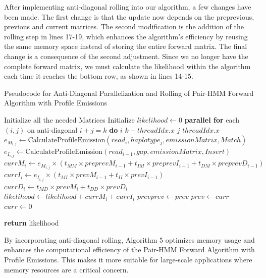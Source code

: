 \documentclass[PhD]{PHlab-thesis}
\begin{document}
After implementing anti-diagonal rolling into our algorithm, a few changes have been made. The first change is that the update now depends on the preprevious, previous and current matrices. The second modification is the addition of the rolling step in lines 17-19, which enhances the algorithm's efficiency by reusing the same memory space instead of storing the entire forward matrix. The final change is a consequence of the second adjustment. Since we no longer have the complete forward matrix, we must calculate the likelihood within the algorithm each time it reaches the bottom row, as shown in lines 14-15.
\newpage
\begin{algorithm}[h]
\caption{Pseudocode for Anti-Diagonal Parallelization and Rolling of Pair-HMM Forward Algorithm with Profile Emissions}
\begin{algorithmic}[1]
\State Initialize all the needed Matrices
\State Initialize $likelihood \gets0$
    \State \textbf{parallel for} each $(i, j)$ on anti-diagonal $i+j=k$ \textbf{do}
    \State $i$ \gets $k - threadIdx.x$
    \State $j$ \gets $threadIdx.x$
        \State $e_{M_{i,j}} \gets \text{CalculateProfileEmission}(read_i, haplotype_j, emissionMatrix, Match)$
        \State $e_{I_{i,j}} \gets \text{CalculateProfileEmission}(read_{i-1}, gap, emissionMatrix, Insert)$
        \State $currM_{i} \gets e_{M_{i,j}} \times (t_{MM} \times preprevM_{i-1} + t_{IM} \times preprevI_{i-1} + t_{DM} \times preprevD_{i-1})$
        \State $currI_{i} \gets e_{I_{i,j}} \times (t_{MI} \times prevM_{i-1} + t_{II} \times prevI_{i-1})$
        \State $currD_{i} \gets t_{MD} \times prevM_{i} + t_{DD} \times prevD_{i}$
    \EndIf
        \State $likelihood \gets likelihood + currM_{i} + currI_{i}$
    \EndIf
\State $prevprev \gets prev$
\State $prev \gets curr$
\State $curr \gets 0$

\EndFor
\State \textbf{return }likelihood
\EndProcedure
\end{algorithmic}
\end{algorithm}
\newline
By incorporating anti-diagonal rolling, Algorithm 5 optimizes memory usage and enhances the computational efficiency of the Pair-HMM Forward Algorithm with Profile Emissions. This makes it more suitable for large-scale applications where memory resources are a critical concern.
\end{document}
